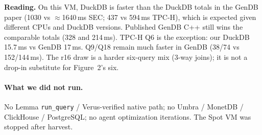 \noindent\textbf{Reading.}
On this VM, DuckDB is faster than the DuckDB totals in the GenDB paper
(1030 vs $\approx$1640\,ms SEC; 437 vs 594\,ms TPC-H), which is expected
given different CPUs and DuckDB versions. Published GenDB C++ still wins
the comparable totals (328 and 214\,ms). TPC-H Q6 is the exception: our
DuckDB 15.7\,ms vs GenDB 17\,ms. Q9/Q18 remain much faster in GenDB
(38/74 vs 152/144\,ms). The r16 draw is a harder six-query mix (3-way
joins); it is not a drop-in substitute for Figure~2's six.

\paragraph{What we did not run.}
No Lemma \texttt{run\_query} / Verus-verified native path; no Umbra /
MonetDB / ClickHouse / PostgreSQL; no agent optimization iterations.
The Spot VM was stopped after harvest.